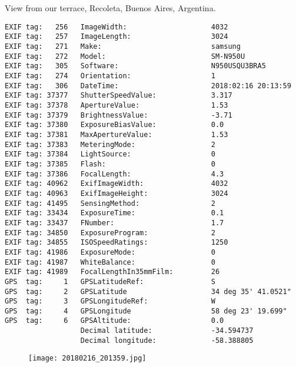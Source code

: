 \section{\protect{}}
\noindent View from our terrace, Recoleta, Buenos Aires, Argentina.
\noindent
\begin{lstlisting}
EXIF tag:   256   ImageWidth:                    4032
EXIF tag:   257   ImageLength:                   3024
EXIF tag:   271   Make:                          samsung
EXIF tag:   272   Model:                         SM-N950U
EXIF tag:   305   Software:                      N950USQU3BRA5
EXIF tag:   274   Orientation:                   1
EXIF tag:   306   DateTime:                      2018:02:16 20:13:59
EXIF tag: 37377   ShutterSpeedValue:             3.317
EXIF tag: 37378   ApertureValue:                 1.53
EXIF tag: 37379   BrightnessValue:               -3.71
EXIF tag: 37380   ExposureBiasValue:             0.0
EXIF tag: 37381   MaxApertureValue:              1.53
EXIF tag: 37383   MeteringMode:                  2
EXIF tag: 37384   LightSource:                   0
EXIF tag: 37385   Flash:                         0
EXIF tag: 37386   FocalLength:                   4.3
EXIF tag: 40962   ExifImageWidth:                4032
EXIF tag: 40963   ExifImageHeight:               3024
EXIF tag: 41495   SensingMethod:                 2
EXIF tag: 33434   ExposureTime:                  0.1
EXIF tag: 33437   FNumber:                       1.7
EXIF tag: 34850   ExposureProgram:               2
EXIF tag: 34855   ISOSpeedRatings:               1250
EXIF tag: 41986   ExposureMode:                  0
EXIF tag: 41987   WhiteBalance:                  0
EXIF tag: 41989   FocalLengthIn35mmFilm:         26
GPS  tag:     1   GPSLatitudeRef:                S
GPS  tag:     2   GPSLatitude                    34 deg 35' 41.0521"
GPS  tag:     3   GPSLongitudeRef:               W
GPS  tag:     4   GPSLongitude                   58 deg 23' 19.699"
GPS  tag:     6   GPSAltitude:                   0.0
                  Decimal latitude:              -34.594737
                  Decimal longitude:             -58.388805

\end{lstlisting}
\clearpage
\begin{figure}
\raggedleft
\texttt{[image: 20180216\_201359.jpg]}
\end{figure}


\clearpage
